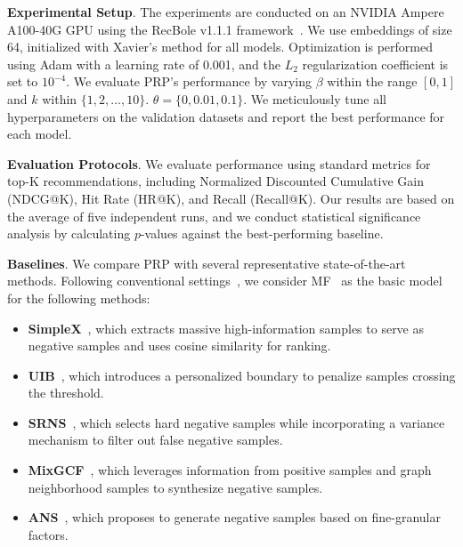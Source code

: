 \textbf{Experimental Setup}. The experiments are conducted on an NVIDIA Ampere A100-40G GPU using the RecBole v1.1.1 framework~\cite{ZMH21}. We use embeddings of size 64, initialized with Xavier's method for all models. Optimization is performed using Adam with a learning rate of 0.001, and the $L_2$ regularization coefficient is set to $10^{-4}$. We evaluate PRP's performance by varying $\beta$ within the range $[0, 1]$ and $k$ within $\{1, 2, \ldots, 10\}$. $\theta = \{0,0.01,0.1\}$. We meticulously tune all hyperparameters on the validation datasets and report the best performance for each model.

\textbf{Evaluation Protocols}. We evaluate performance using standard metrics for top-K recommendations, including Normalized Discounted Cumulative Gain (NDCG@K), Hit Rate (HR@K), and Recall (Recall@K). Our results are based on the average of five independent runs, and we conduct statistical significance analysis by calculating $p$-values against the best-performing baseline.

\textbf{Baselines}. We compare PRP with several representative state-of-the-art methods. Following conventional settings~\cite{RFG12, WYZ17, CLJ22}, we consider MF~\cite{HLZ17} as the basic model for the following methods:
\begin{itemize}
    \item \textbf{SimpleX}~\cite{MZW21}, which extracts massive high-information samples to serve as negative samples and uses cosine similarity for ranking.
    \item \textbf{UIB}~\cite{ZZY22}, which introduces a personalized boundary to penalize samples crossing the threshold.
    \item \textbf{SRNS}~\cite{DQY20}, which selects hard negative samples while incorporating a variance mechanism to filter out false negative samples.
    \item \textbf{MixGCF}~\cite{HDD21}, which leverages information from positive samples and graph neighborhood samples to synthesize negative samples.
    \item \textbf{ANS}~\cite{ZCL23}, which proposes to generate negative samples based on fine-granular factors.
\end{itemize}

